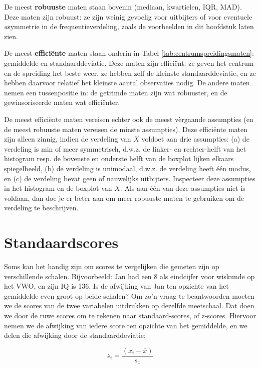 \documentclass[
]{book}
\begin{document}
De meest \textbf{robuuste} maten staan
bovenin (mediaan, kwartielen, IQR, MAD). Deze maten zijn robuust: ze
zijn weinig gevoelig voor uitbijters of voor eventuele \emph{a}symmetrie in de
frequentieverdeling, zoals de voorbeelden in dit hoofdstuk laten zien.

De meest \textbf{efficiënte} maten staan onderin in
Tabel \ref{tab:centrumspreidingsmaten}: gemiddelde en standaarddeviatie.
Deze maten zijn efficiënt: ze geven het centrum en de spreiding het
beste weer, ze hebben zelf de kleinste standaarddeviatie, en ze hebben
daarvoor relatief het kleinste aantal observaties nodig. De andere maten
nemen een tussenpositie in: de getrimde maten zijn wat robuuster, en de
gewinsoriseerde maten wat efficiënter.

De meest efficiënte maten vereisen echter ook de meest vèrgaande
assumpties (en de meest robuuste maten vereisen de minste assumpties).
Deze efficiënte maten zijn alleen zinnig, indien de verdeling van \(X\)
voldoet aan drie assumpties: (a) de verdeling is min of meer
symmetrisch, d.w.z. de linker- en rechter-helft van het histogram resp.
de bovenste en onderste helft van de boxplot lijken elkaars
spiegelbeeld, (b) de verdeling is unimodaal, d.w.z. de verdeling heeft
één modus, en (c) de verdeling bevat geen of nauwelijks uitbijters.
Inspecteer deze assumpties in het histogram en de boxplot van \(X\). Als
aan één van deze assumpties niet is voldaan, dan doe je er beter aan om
meer robuuste maten te gebruiken om de verdeling te beschrijven.

\section{Standaardscores}\label{sec:standaardscores}

Soms kan het handig zijn om scores te vergelijken die gemeten zijn op
verschillende schalen. Bijvoorbeeld: Jan had een 8 als eindcijfer voor
wiskunde op het VWO, en zijn IQ is 136. Is de afwijking van Jan ten
opzichte van het gemiddelde even groot op beide schalen? Om zo'n vraag
te beantwoorden moeten we de scores van de twee variabelen uitdrukken op
dezelfde meetschaal. Dat doen we door de ruwe scores om te rekenen naar
standaard-scores, of z-scores. Hiervoor nemen we de afwijking van iedere
score ten opzichte van het gemiddelde, en we delen die afwijking door de
standaarddeviatie:

\begin{equation}
    z_i = \frac{(x_i-\overline{x})}{s_x}
   \label{eq:zscores}
\end{equation}
\end{document}
